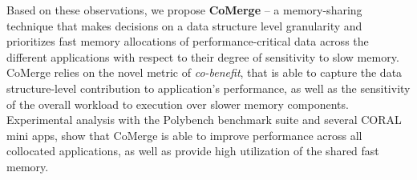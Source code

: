 Based on these observations, we propose {\bf CoMerge} -- a memory-sharing technique that makes decisions on a data structure level granularity and prioritizes fast memory allocations of performance-critical data across 
the different applications with respect to their degree of sensitivity to slow memory. 
CoMerge relies on the novel metric of {\it co-benefit}, that is able to capture the data structure-level contribution to application's performance, as well as the sensitivity of the overall workload to execution over slower memory components.
Experimental analysis with the Polybench benchmark suite and several CORAL mini apps, show that CoMerge is able to improve performance across all collocated applications, as well as provide high utilization of the shared fast memory.

